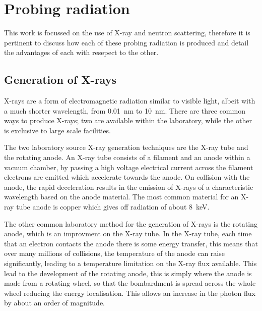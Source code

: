 \section{Probing radiation}

This work is focussed on the use of X-ray and neutron scattering, therefore it is pertinent to discuss how each of these probing radiation is produced and detail the advantages of each with resepect to the other.

\subsection{Generation of X-rays}

X-rays are a form of electromagnetic radiation similar to visible light, albeit with a much shorter wavelength, from \SI{0.01}{\nano\meter} to \SI{10}{\nano\meter}. There are three common ways to produce X-rays; two are available within the laboratory, while the other is exclusive to large scale facilities.

The two laboratory source X-ray generation techniques are the X-ray tube and the rotating anode. An X-ray tube consists of a filament and an anode within a vacuum chamber, by passing a high voltage electrical current across the filament electrons are emitted which accelerate towards the anode. On collision with the anode, the rapid deceleration results in the emission of X-rays of a characteristic wavelength based on the anode material.\cite{Schnablegger2017} The most common material for an X-ray tube anode is copper which gives off radiation of about \SI{8}{\kilo\eV}.

The other common laboratory method for the generation of X-rays is the rotating anode, which is an improvment on the X-ray tube. In the X-ray tube, each time that an electron contacts the anode there is some energy transfer, this means that over many millions of collisions, the temperature of the anode can raise significantly, leading to a temperature limitation on the X-ray flux available. This lead to the development of the rotating anode, this is simply where the anode is made from a rotating wheel, so that the bombardment is spread across the whole wheel reducing the energy localisation. This allows an increase in the photon flux by about an order of magnitude.\cite{Schnablegger2017}

